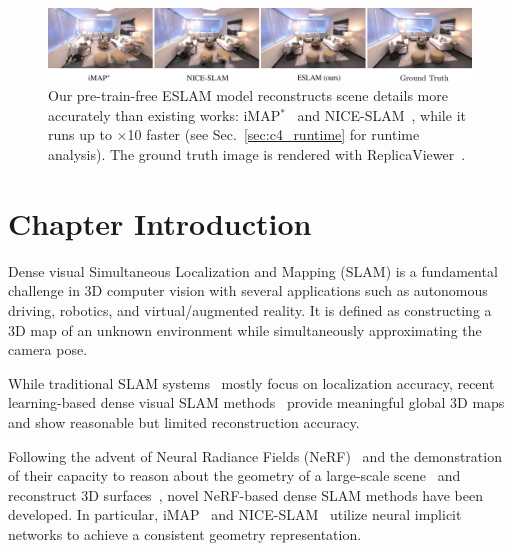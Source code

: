\begin{figure}[t]
    \begin{center}
        \includegraphics[width=1.0\linewidth]{images/chapter4/figures/Fig1.jpg}
    \end{center}
   \caption{Our pre-train-free ESLAM model reconstructs scene details more accurately than existing works: iMAP$^*$~\citep{sucar2021imap} and NICE-SLAM~\citep{zhu2022nice}, while it runs up to $\times$10 faster (see Sec.~\ref{sec:c4_runtime} for runtime analysis). The ground truth image is rendered with ReplicaViewer~\citep{replica19arxiv}.}
\end{figure}

\section{Chapter Introduction}

Dense visual Simultaneous Localization and Mapping (SLAM) is a fundamental challenge in 3D computer vision with several applications such as autonomous driving, robotics, and virtual/augmented reality. It is defined as constructing a 3D map of an unknown environment while simultaneously approximating the camera pose.

While traditional SLAM systems~\citep{mur2017orb, engel2014lsd, newcombe2011dtam, schops2019bad, whelan2015elasticfusion, whelan2012kintinuous} mostly focus on localization accuracy, recent learning-based dense visual SLAM methods~\citep{bloesch2018codeslam, yang2022fd, czarnowski2020deepfactors, sucar2020nodeslam, zhi2019scenecode, teed2021droid, mccormac2017semanticfusion, sunderhauf2017meaningful, tang2018ba, koestler2022tandem} provide meaningful global 3D maps and show reasonable but limited reconstruction accuracy.

Following the advent of Neural Radiance Fields (NeRF)~\citep{mildenhall2020nerf} and the demonstration of their capacity to reason about the geometry of a large-scale scene~\citep{deng2022depth, kosiorek2021nerf, chen2021mvsnerf, wei2021nerfingmvs, jain2021putting, wu2022scalable} and reconstruct 3D surfaces~\citep{yariv2021volume, azinovic2022neural, wang2021neus, sun2022neural, or2022stylesdf, li2022bnv, ortiz2022isdf, zhang2021ners, wang2022neuris}, novel NeRF-based dense SLAM methods have been developed. In particular, iMAP~\citep{sucar2021imap} and NICE-SLAM~\citep{zhu2022nice} utilize neural implicit networks to achieve a consistent geometry representation.

